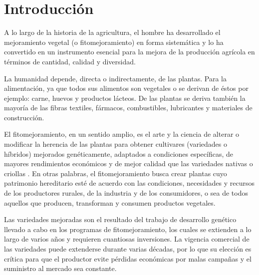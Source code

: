 

\chapter{Introducción}


A lo largo de la historia de la agricultura, el hombre ha desarrollado el mejoramiento vegetal (o fitomejoramiento) en forma sistemática y lo ha convertido en un instrumento esencial para la mejora de la producción agrícola en términos de cantidad, calidad y diversidad.  


La humanidad depende, directa o indirectamente, de las plantas. Para la alimentación, ya que todos sus alimentos son vegetales o se derivan de éstos por ejemplo: carne, huevos y productos lácteos. De las plantas se deriva también la mayoría de las fibras textiles, fármacos, combustibles, lubricantes y materiales de construcción.

El fitomejoramiento, en un sentido amplio, es el arte y la ciencia de alterar o modificar la herencia de las plantas para obtener cultivares (variedades o híbridos) mejorados genéticamente, adaptados a condiciones específicas, de mayores rendimientos económicos y de mejor calidad que las variedades nativas o criollas \citep{Allard67}. En otras palabras, el fitomejoramiento busca crear plantas cuyo patrimonio hereditario esté de acuerdo con las condiciones, necesidades y recursos de los productores rurales, de la industria y de los consumidores, o sea de todos aquellos que producen, transforman y consumen productos vegetales. 

Las variedades mejoradas son el resultado del trabajo de desarrollo genético llevado a cabo en los programas de fitomejoramiento, los cuales se extienden a lo largo de varios años y requieren cuantiosas inversiones. La vigencia comercial de las variedades puede extenderse durante varias décadas, por lo que su elección es crítica para que el productor evite pérdidas económicas por malas campañas y el suministro al mercado sea constante. 

